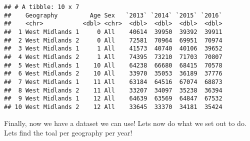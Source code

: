 \documentclass[]{article}
\begin{document}
\begin{verbatim}
## # A tibble: 10 x 7
##    Geography         Age Sex   `2013` `2014` `2015` `2016`
##    <chr>           <dbl> <chr>  <dbl>  <dbl>  <dbl>  <dbl>
##  1 West Midlands 1     0 All    40614  39950  39392  39911
##  2 West Midlands 2     0 All    72581  70964  69951  70974
##  3 West Midlands 1     1 All    41573  40740  40106  39652
##  4 West Midlands 2     1 All    74395  73210  71703  70807
##  5 West Midlands 1    10 All    64238  66680  68415  70578
##  6 West Midlands 2    10 All    33970  35053  36189  37776
##  7 West Midlands 1    11 All    63184  64516  67074  68873
##  8 West Midlands 2    11 All    33207  34097  35238  36394
##  9 West Midlands 1    12 All    64639  63569  64847  67532
## 10 West Midlands 2    12 All    33645  33370  34181  35424
\end{verbatim}

Finally, now we have a dataset we can use! Lets now do what we set out
to do. Lets find the toal per geography per year!
\end{document}
